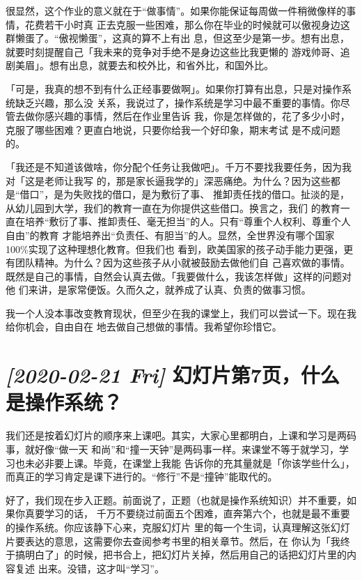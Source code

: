 \documentclass{wx672ctexart} [NO-DEFAULT-PACKAGES] \usepackage{wx672hyperref}
\begin{document}
很显然，这个作业的意义就在于“做事情”。如果你能保证每周做一件稍微像样的事情，花费若干小时真
正去克服一些困难，那么你在毕业的时候就可以傲视身边这群懒蛋了。“傲视懒蛋”，这真的算不上有出
息，但这至少是第一步。想有出息，就要时刻提醒自己「我未来的竞争对手绝不是身边这些比我更懒的
游戏帅哥、追剧美眉」。想有出息，就要去和校外比，和省外比，和国外比。

「可是，我真的想不到有什么正经事要做啊」。如果你打算有出息，只是对操作系统缺乏兴趣，那么没
关系，我说过了，操作系统是学习中最不重要的事情。你尽管去做你感兴趣的事情，然后在作业里告诉
我，你是怎样做的，花了多少小时，克服了哪些困难？更直白地说，只要你给我一个好印象，期末考试
是不成问题的。

「我还是不知道该做啥，你分配个任务让我做吧」。千万不要找我要任务，因为我对「这是老师让我写
的，那是家长逼我学的」深恶痛绝。为什么？因为这些都是“借口”，是为失败找的借口，是为敷衍了事、
推卸责任找的借口。扯淡的是，从幼儿园到大学，我们的教育一直在为你提供这些借口。换言之，我们
的教育一直在培养“敷衍了事、推卸责任、毫无担当”的人。只有“尊重个人权利、尊重个人自由”的教育
才能培养出“负责任、有胆当”的人。显然，全世界没有哪个国家100\%实现了这种理想化教育。但我们也
看到，欧美国家的孩子动手能力更强，更有团队精神。为什么？因为这些孩子从小就被鼓励去做他们自
己喜欢做的事情。既然是自己的事情，自然会认真去做。「我要做什么，我该怎样做」这样的问题对他
们来讲，是家常便饭。久而久之，就养成了认真、负责的做事习惯。

我一个人没本事改变教育现状，但至少在我的课堂上，我们可以尝试一下。现在我给你机会，自由自在
地去做自己想做的事情。我希望你珍惜它。

\section{\textit{[2020-02-21 Fri] } 幻灯片第7页，什么是操作系统？}
\label{sec:org7ca60d0}

我们还是按着幻灯片的顺序来上课吧。其实，大家心里都明白，上课和学习是两码事，就好像“做一天
和尚”和“撞一天钟”是两码事一样。来课堂不等于就学习，学习也未必非要上课。毕竟，在课堂上我能
告诉你的充其量就是「你该学些什么」，而真正的学习肯定是课下进行的。“修行”不是“撞钟”能取代的。

好了，我们现在步入正题。前面说了，正题（也就是操作系统知识）并不重要，如果你真要学习的话，
千万不要绕过前面五个困难，直奔第六个，也就是最不重要的操作系统。你应该静下心来，克服幻灯片
里的每一个生词，认真理解这张幻灯片要表达的意思，这需要你去查阅参考书里的相关章节。然后，在
你认为「我终于搞明白了」的时候，把书合上，把幻灯片关掉，然后用自己的话把幻灯片里的内容复述
出来。没错，这才叫“学习”。
\end{document}
